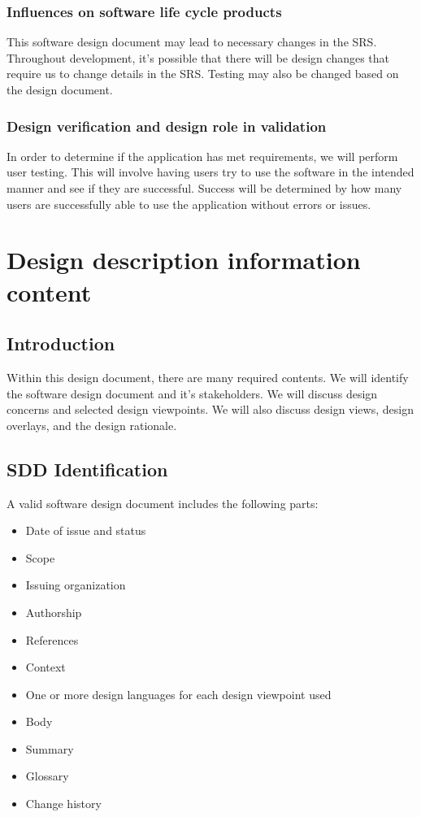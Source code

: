 \documentclass[letterpaper,10pt,draftclsnofoot,onecolumn,titlepage]{IEEEtran}
\begin{document}
			\subsubsection{Influences on software life cycle products}
				This software design document may lead to necessary changes in the SRS.
				Throughout development, it's possible that there will be design changes that require us to change details in the SRS.
				Testing may also be changed based on the design document.

			\subsubsection{Design verification and design role in validation}
				In order to determine if the application has met requirements, we will perform user testing.
				This will involve having users try to use the software in the intended manner and see if they are successful.
				Success will be determined by how many users are successfully able to use the application without errors or issues.

	\section{Design description information content}

		\subsection{Introduction}
			Within this design document, there are many required contents.
			We will identify the software design document and it's stakeholders.
			We will discuss design concerns and selected design viewpoints.
			We will also discuss design views, design overlays, and the design rationale.

		\subsection{SDD Identification}
			A valid software design document includes the following parts:
			\begin{itemize}
				\item{Date of issue and status}
				\item{Scope}
				\item{Issuing organization}
				\item{Authorship}
				\item{References}
				\item{Context}
				\item{One or more design languages for each design viewpoint used}
				\item{Body}
				\item{Summary}
				\item{Glossary}
				\item{Change history}
			\end{itemize}
\end{document}
